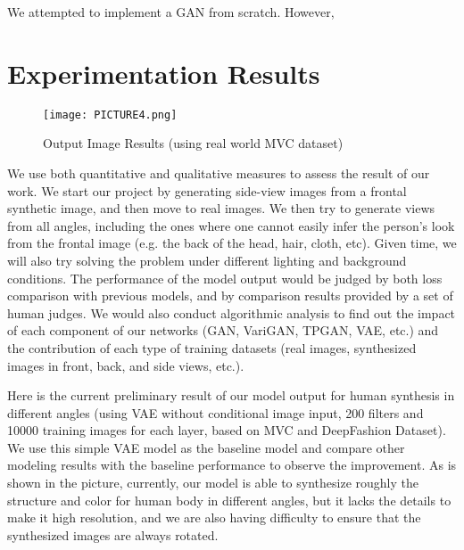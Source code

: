 \documentclass[10pt,conference]{IEEEtran}
\begin{document}
We attempted to implement a GAN from scratch. However, 

\section{Experimentation Results}







\begin{figure}[htbp]
\centering
\texttt{[image: PICTURE4.png]}
\caption{Output Image Results (using real world MVC dataset)}
\end{figure}

We use both quantitative and qualitative measures to assess the result of our work. 
We  start our project by generating side-view images from a frontal synthetic image, and then move to real images. We then try to generate views from all angles, including the ones where one cannot easily infer the person’s look from the frontal image (e.g. the back of the head, hair, cloth, etc). Given time, we will also try solving the problem under different lighting and background conditions. The performance of the model output would be judged by both loss comparison with previous models, and by comparison results provided by a set of human judges. We would also conduct algorithmic analysis to find out the impact of each component of our networks (GAN, VariGAN, TPGAN, VAE, etc.) and the contribution of each type of training datasets (real images, synthesized images in front, back, and side views, etc.).

Here is the current preliminary result of our model output for human synthesis in different angles (using VAE without conditional image input, 200 filters and 10000 training images for each layer, based on MVC and DeepFashion Dataset). We use this simple VAE model as the  baseline model and compare other modeling results with the baseline performance to observe the improvement. As is shown in the picture, currently, our model is able to synthesize roughly the structure and color for human body in different angles, but it lacks the details to make it high resolution, and we are also having difficulty to ensure that the synthesized images are always rotated.
\end{document}
